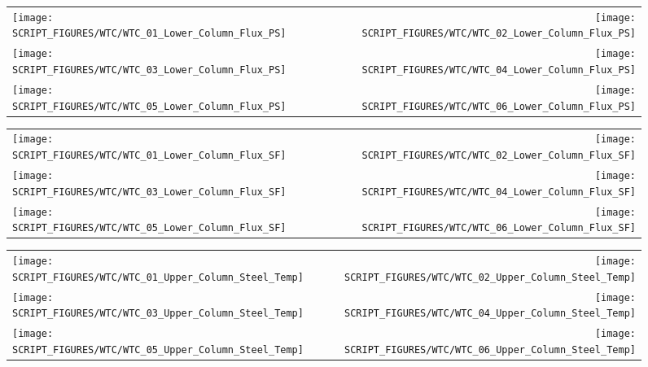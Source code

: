 \begin{figure}[!ht]
\begin{tabular*}{\textwidth}{l@{\extracolsep{\fill}}r}
\texttt{[image: SCRIPT\_FIGURES/WTC/WTC\_01\_Lower\_Column\_Flux\_PS]} &
\texttt{[image: SCRIPT\_FIGURES/WTC/WTC\_02\_Lower\_Column\_Flux\_PS]} \\
\texttt{[image: SCRIPT\_FIGURES/WTC/WTC\_03\_Lower\_Column\_Flux\_PS]} &
\texttt{[image: SCRIPT\_FIGURES/WTC/WTC\_04\_Lower\_Column\_Flux\_PS]} \\
\texttt{[image: SCRIPT\_FIGURES/WTC/WTC\_05\_Lower\_Column\_Flux\_PS]} &
\texttt{[image: SCRIPT\_FIGURES/WTC/WTC\_06\_Lower\_Column\_Flux\_PS]}
\end{tabular*}
\end{figure}

\begin{figure}[!ht]
\begin{tabular*}{\textwidth}{l@{\extracolsep{\fill}}r}
\texttt{[image: SCRIPT\_FIGURES/WTC/WTC\_01\_Lower\_Column\_Flux\_SF]} &
\texttt{[image: SCRIPT\_FIGURES/WTC/WTC\_02\_Lower\_Column\_Flux\_SF]} \\
\texttt{[image: SCRIPT\_FIGURES/WTC/WTC\_03\_Lower\_Column\_Flux\_SF]} &
\texttt{[image: SCRIPT\_FIGURES/WTC/WTC\_04\_Lower\_Column\_Flux\_SF]} \\
\texttt{[image: SCRIPT\_FIGURES/WTC/WTC\_05\_Lower\_Column\_Flux\_SF]} &
\texttt{[image: SCRIPT\_FIGURES/WTC/WTC\_06\_Lower\_Column\_Flux\_SF]}
\end{tabular*}
\end{figure}

\begin{figure}[!ht]
\begin{tabular*}{\textwidth}{l@{\extracolsep{\fill}}r}
\texttt{[image: SCRIPT\_FIGURES/WTC/WTC\_01\_Upper\_Column\_Steel\_Temp]} &
\texttt{[image: SCRIPT\_FIGURES/WTC/WTC\_02\_Upper\_Column\_Steel\_Temp]} \\
\texttt{[image: SCRIPT\_FIGURES/WTC/WTC\_03\_Upper\_Column\_Steel\_Temp]} &
\texttt{[image: SCRIPT\_FIGURES/WTC/WTC\_04\_Upper\_Column\_Steel\_Temp]} \\
\texttt{[image: SCRIPT\_FIGURES/WTC/WTC\_05\_Upper\_Column\_Steel\_Temp]} &
\texttt{[image: SCRIPT\_FIGURES/WTC/WTC\_06\_Upper\_Column\_Steel\_Temp]}
\end{tabular*}
\end{figure}

